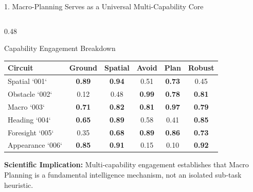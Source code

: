 \documentclass[aspectratio=169, 10pt]{beamer}
\begin{document}
\begin{frame}{1. Macro-Planning Serves as a Universal Multi-Capability Core}
\begin{columns}[T]
    \begin{column}{0.48\textwidth}
      \begin{block}{Capability Engagement Breakdown}
        \scriptsize
        \centering
        \setlength{\tabcolsep}{2pt}
        \begin{tabular}{lccccc}
          \toprule
          \textbf{Circuit} & \textbf{Ground} & \textbf{Spatial} & \textbf{Avoid} & \textbf{Plan} & \textbf{Robust} \\
          \midrule
          Spatial `001` & \textbf{0.89} & \textbf{0.94} & 0.51 & \textbf{0.73} & 0.45 \\
          Obstacle `002` & 0.12 & 0.48 & \textbf{0.99} & \textbf{0.78} & \textbf{0.81} \\
          Macro `003` & \textbf{0.71} & \textbf{0.82} & \textbf{0.81} & \textbf{0.97} & \textbf{0.79} \\
          Heading `004` & \textbf{0.65} & \textbf{0.89} & 0.58 & 0.41 & \textbf{0.85} \\
          Foresight `005` & 0.35 & \textbf{0.68} & \textbf{0.89} & \textbf{0.86} & \textbf{0.73} \\
          Appearance `006` & \textbf{0.85} & \textbf{0.91} & 0.15 & 0.10 & \textbf{0.92} \\
          \bottomrule
        \end{tabular}
      \end{block}
      \vspace{0.05cm}
      \scriptsize \textbf{Scientific Implication:} Multi-capability engagement establishes that Macro Planning is a fundamental intelligence mechanism, not an isolated sub-task heuristic.
    \end{column}
  \end{columns}
\end{frame}
\end{document}
